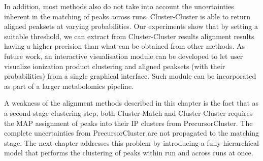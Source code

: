 In addition, most methods also do not take into account the uncertainties inherent in the matching of peaks across runs. Cluster-Cluster is able to return aligned peaksets at varying probabilities. Our experiments show that by setting a suitable threshold, we can extract from Cluster-Cluster results alignment results having a higher precision than what can be obtained from other methods. As future work, an interactive visualisation module can be developed to let user visualize ionization product clustering and aligned peaksets (with their probabilities) from a single graphical interface. Such module can be incorporated as part of a larger metabolomics pipeline.

A weakness of the alignment methods described in this chapter is the fact that as a second-stage clustering step, both Cluster-Match and Cluster-Cluster requires the MAP assignment of peaks into their IP clusters from PrecursorCluster. The complete uncertainties from PrecursorCluster are not propagated to the matching stage. The next chapter addresses this problem by introducing a fully-hierarchical model that performs the clustering of peaks within run and across runs at once.
